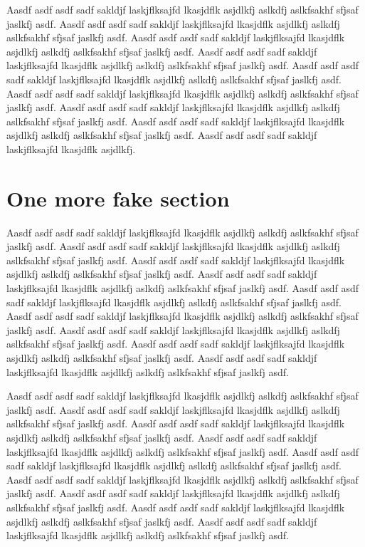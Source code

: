 Aasdf asdf asdf sadf sakldjf laskjflksajfd lkasjdflk asjdlkfj aslkdfj
aslkfsakhf sfjsaf jaslkfj asdf.  Aasdf asdf asdf sadf sakldjf
laskjflksajfd lkasjdflk asjdlkfj aslkdfj aslkfsakhf sfjsaf jaslkfj
asdf.  Aasdf asdf asdf sadf sakldjf laskjflksajfd lkasjdflk asjdlkfj
aslkdfj aslkfsakhf sfjsaf jaslkfj asdf.  Aasdf asdf asdf sadf sakldjf
laskjflksajfd lkasjdflk asjdlkfj aslkdfj aslkfsakhf sfjsaf jaslkfj
asdf.  Aasdf asdf asdf sadf sakldjf laskjflksajfd lkasjdflk asjdlkfj
aslkdfj aslkfsakhf sfjsaf jaslkfj asdf.  Aasdf asdf asdf sadf sakldjf
laskjflksajfd lkasjdflk asjdlkfj aslkdfj aslkfsakhf sfjsaf jaslkfj
asdf.  Aasdf asdf asdf sadf sakldjf laskjflksajfd lkasjdflk asjdlkfj
aslkdfj aslkfsakhf sfjsaf jaslkfj asdf.  Aasdf asdf asdf sadf sakldjf
laskjflksajfd lkasjdflk asjdlkfj aslkdfj aslkfsakhf sfjsaf jaslkfj
asdf.  Aasdf asdf asdf sadf sakldjf laskjflksajfd lkasjdflk asjdlkfj.

\section{One more fake section}
\label{sec:one-more-face}

Aasdf asdf asdf sadf sakldjf laskjflksajfd lkasjdflk asjdlkfj aslkdfj
aslkfsakhf sfjsaf jaslkfj asdf.  Aasdf asdf asdf sadf sakldjf
laskjflksajfd lkasjdflk asjdlkfj aslkdfj aslkfsakhf sfjsaf jaslkfj
asdf.  Aasdf asdf asdf sadf sakldjf laskjflksajfd lkasjdflk asjdlkfj
aslkdfj aslkfsakhf sfjsaf jaslkfj asdf.  Aasdf asdf asdf sadf sakldjf
laskjflksajfd lkasjdflk asjdlkfj aslkdfj aslkfsakhf sfjsaf jaslkfj
asdf.  Aasdf asdf asdf sadf sakldjf laskjflksajfd lkasjdflk asjdlkfj
aslkdfj aslkfsakhf sfjsaf jaslkfj asdf.  Aasdf asdf asdf sadf sakldjf
laskjflksajfd lkasjdflk asjdlkfj aslkdfj aslkfsakhf sfjsaf jaslkfj
asdf.  Aasdf asdf asdf sadf sakldjf laskjflksajfd lkasjdflk asjdlkfj
aslkdfj aslkfsakhf sfjsaf jaslkfj asdf.  Aasdf asdf asdf sadf sakldjf
laskjflksajfd lkasjdflk asjdlkfj aslkdfj aslkfsakhf sfjsaf jaslkfj
asdf.  Aasdf asdf asdf sadf sakldjf laskjflksajfd lkasjdflk asjdlkfj
aslkdfj aslkfsakhf sfjsaf jaslkfj asdf.

Aasdf asdf asdf sadf sakldjf laskjflksajfd lkasjdflk asjdlkfj aslkdfj
aslkfsakhf sfjsaf jaslkfj asdf.  Aasdf asdf asdf sadf sakldjf
laskjflksajfd lkasjdflk asjdlkfj aslkdfj aslkfsakhf sfjsaf jaslkfj
asdf.  Aasdf asdf asdf sadf sakldjf laskjflksajfd lkasjdflk asjdlkfj
aslkdfj aslkfsakhf sfjsaf jaslkfj asdf.  Aasdf asdf asdf sadf sakldjf
laskjflksajfd lkasjdflk asjdlkfj aslkdfj aslkfsakhf sfjsaf jaslkfj
asdf.  Aasdf asdf asdf sadf sakldjf laskjflksajfd lkasjdflk asjdlkfj
aslkdfj aslkfsakhf sfjsaf jaslkfj asdf.  Aasdf asdf asdf sadf sakldjf
laskjflksajfd lkasjdflk asjdlkfj aslkdfj aslkfsakhf sfjsaf jaslkfj
asdf.  Aasdf asdf asdf sadf sakldjf laskjflksajfd lkasjdflk asjdlkfj
aslkdfj aslkfsakhf sfjsaf jaslkfj asdf.  Aasdf asdf asdf sadf sakldjf
laskjflksajfd lkasjdflk asjdlkfj aslkdfj aslkfsakhf sfjsaf jaslkfj
asdf.  Aasdf asdf asdf sadf sakldjf laskjflksajfd lkasjdflk asjdlkfj
aslkdfj aslkfsakhf sfjsaf jaslkfj asdf.


